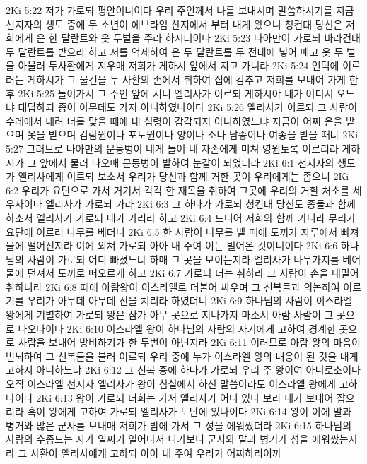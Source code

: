 2Ki 5:22  저가 가로되 평안이니이다 우리 주인께서 나를 보내시며 말씀하시기를 지금 선지자의 생도 중에 두 소년이 에브라임 산지에서 부터 내게 왔으니 청컨대 당신은 저희에게 은 한 달란트와 옷 두벌을 주라 하시더이다
2Ki 5:23  나아만이 가로되 바라건대 두 달란트를 받으라 하고 저를 억제하여 은 두 달란트를 두 전대에 넣어 매고 옷 두 벌을 아울러 두사환에게 지우매 저희가 게하시 앞에서 지고 가니라
2Ki 5:24  언덕에 이르러는 게하시가 그 물건을 두 사환의 손에서 취하여 집에 감추고 저희를 보내어 가게 한 후
2Ki 5:25  들어가서 그 주인 앞에 서니 엘리사가 이르되 게하시야 네가 어디서 오느냐 대답하되 종이 아무데도 가지 아니하였나이다
2Ki 5:26  엘리사가 이르되 그 사람이 수레에서 내려 너를 맞을 때에 내 심령이 감각되지 아니하였느냐 지금이 어찌 은을 받으며 옷을 받으며 감람원이나 포도원이나 양이나 소나 남종이나 여종을 받을 때냐
2Ki 5:27  그러므로 나아만의 문둥병이 네게 들어 네 자손에게 미쳐 영원토록 이르리라 게하시가 그 앞에서 물러 나오매 문둥병이 발하여 눈같이 되었더라
2Ki 6:1  선지자의 생도가 엘리사에게 이르되 보소서 우리가 당신과 함께 거한 곳이 우리에게는 좁으니
2Ki 6:2  우리가 요단으로 가서 거기서 각각 한 재목을 취하여 그곳에 우리의 거할 처소를 세우사이다 엘리사가 가로되 가라
2Ki 6:3  그 하나가 가로되 청컨대 당신도 종들과 함께 하소서 엘리사가 가로되 내가 가리라 하고
2Ki 6:4  드디어 저희와 함께 가니라 무리가 요단에 이르러 나무를 베더니
2Ki 6:5  한 사람이 나무를 벨 때에 도끼가 자루에서 빠져 물에 떨어진지라 이에 외쳐 가로되 아아 내 주여 이는 빌어온 것이니이다
2Ki 6:6  하나님의 사람이 가로되 어디 빠졌느냐 하매 그 곳을 보이는지라 엘리사가 나무가지를 베어 물에 던져서 도끼로 떠오르게 하고
2Ki 6:7  가로되 너는 취하라 그 사람이 손을 내밀어 취하니라
2Ki 6:8  때에 아람왕이 이스라엘로 더불어 싸우며 그 신복들과 의논하여 이르기를 우리가 아무데 아무데 진을 치리라 하였더니
2Ki 6:9  하나님의 사람이 이스라엘 왕에게 기별하여 가로되 왕은 삼가 아무 곳으로 지나가지 마소서 아람 사람이 그 곳으로 나오나이다
2Ki 6:10  이스라엘 왕이 하나님의 사람의 자기에게 고하여 경계한 곳으로 사람을 보내어 방비하기가 한 두번이 아닌지라
2Ki 6:11  이러므로 아람 왕의 마음이 번뇌하여 그 신복들을 불러 이르되 우리 중에 누가 이스라엘 왕의 내응이 된 것을 내게 고하지 아니하느냐
2Ki 6:12  그 신복 중에 하나가 가로되 우리 주 왕이여 아니로소이다 오직 이스라엘 선지자 엘리사가 왕이 침실에서 하신 말씀이라도 이스라엘 왕에게 고하나이다
2Ki 6:13  왕이 가로되 너희는 가서 엘리사가 어디 있나 보라 내가 보내어 잡으리라 혹이 왕에게 고하여 가로되 엘리사가 도단에 있나이다
2Ki 6:14  왕이 이에 말과 병거와 많은 군사를 보내매 저희가 밤에 가서 그 성을 에워쌌더라
2Ki 6:15  하나님의 사람의 수종드는 자가 일찌기 일어나서 나가보니 군사와 말과 병거가 성을 에워쌌는지라 그 사환이 엘리사에게 고하되 아아 내 주여 우리가 어찌하리이까
